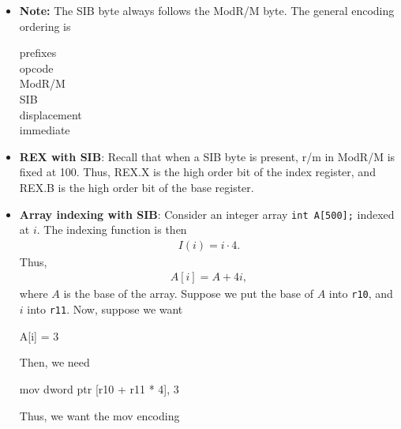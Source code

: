 \documentclass{report}
\begin{document}
\begin{itemize}
                So, the binary encoding of the scale therefore implies that
                \begin{align*}
                    s = 2^{s_{1}s_{0}}
                .\end{align*}
            \item \textbf{Note:} The SIB byte always follows the ModR/M byte. The general encoding ordering is 
                \begin{center}
                    prefixes \\
                    opcode \\
                    ModR/M \\
                    SIB \\
                    displacement \\
                    immediate
                \end{center}
            \item \textbf{REX with SIB}: Recall that when a SIB byte is present, r/m in ModR/M is fixed at 100. Thus, REX.X is the high order bit of the index register, and REX.B is the high order bit of the base register.
            \item \textbf{Array indexing with SIB}: Consider an integer array \texttt{int A[500];} indexed at $i$. The indexing function is then
                \begin{align*}
                    I(i) = i \cdot 4
                .\end{align*}
                Thus, 
                \begin{align*}
                    A[i] = A + 4i
                ,\end{align*}
                where $A$ is the base of the array. Suppose we put the base of $A$ into \texttt{r10}, and $i$ into \texttt{r11}. Now, suppose we want 
                \bigbreak \noindent 
                \begin{cppcode}
                    A[i] = 3
                \end{cppcode}
                \bigbreak \noindent 
                Then, we need
                \bigbreak \noindent 
                \begin{cppcode}
                    mov dword ptr [r10 + r11 * 4], 3
                \end{cppcode}
                \bigbreak \noindent 
                Thus, we want the mov encoding
                \bigbreak \noindent 
                \begin{cppcode}

\end{cppcode}
\end{itemize}
\end{document}
